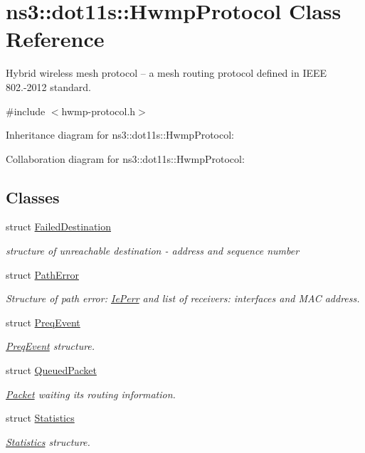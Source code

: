 \hypertarget{classns3_1_1dot11s_1_1HwmpProtocol}{}\section{ns3\+:\+:dot11s\+:\+:Hwmp\+Protocol Class Reference}
\label{classns3_1_1dot11s_1_1HwmpProtocol}


Hybrid wireless mesh protocol -- a mesh routing protocol defined in I\+E\+EE 802.-\/2012 standard.  




{\ttfamily \#include $<$hwmp-\/protocol.\+h$>$}



Inheritance diagram for ns3\+:\+:dot11s\+:\+:Hwmp\+Protocol\+:


Collaboration diagram for ns3\+:\+:dot11s\+:\+:Hwmp\+Protocol\+:
\subsection*{Classes}
\begin{DoxyCompactItemize}
\item 
struct \hyperlink{structns3_1_1dot11s_1_1HwmpProtocol_1_1FailedDestination}{Failed\+Destination}
\begin{DoxyCompactList}\small\item\em structure of unreachable destination -\/ address and sequence number \end{DoxyCompactList}\item 
struct \hyperlink{structns3_1_1dot11s_1_1HwmpProtocol_1_1PathError}{Path\+Error}
\begin{DoxyCompactList}\small\item\em Structure of path error\+: \hyperlink{classns3_1_1dot11s_1_1IePerr}{Ie\+Perr} and list of receivers\+: interfaces and M\+AC address. \end{DoxyCompactList}\item 
struct \hyperlink{structns3_1_1dot11s_1_1HwmpProtocol_1_1PreqEvent}{Preq\+Event}
\begin{DoxyCompactList}\small\item\em \hyperlink{structns3_1_1dot11s_1_1HwmpProtocol_1_1PreqEvent}{Preq\+Event} structure. \end{DoxyCompactList}\item 
struct \hyperlink{structns3_1_1dot11s_1_1HwmpProtocol_1_1QueuedPacket}{Queued\+Packet}
\begin{DoxyCompactList}\small\item\em \hyperlink{classns3_1_1Packet}{Packet} waiting its routing information. \end{DoxyCompactList}\item 
struct \hyperlink{structns3_1_1dot11s_1_1HwmpProtocol_1_1Statistics}{Statistics}
\begin{DoxyCompactList}\small\item\em \hyperlink{structns3_1_1dot11s_1_1HwmpProtocol_1_1Statistics}{Statistics} structure. \end{DoxyCompactList}\end{DoxyCompactItemize}
